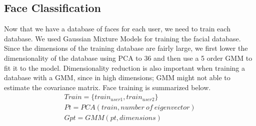 \documentclass{article}
\begin{document}
\subsection{Face Classification}
Now that we have a database of faces for each user, we need to train each database. We used Gaussian Mixture Models for training the facial database. Since the dimensions of the training database are fairly large, we first lower the dimensionality of the database using PCA to 36 and then use a 5 order GMM to fit it to the model. Dimensionality reduction is also important when training a database with a GMM, since in high dimensions; GMM might not able to estimate the covariance matrix. Face training is summarized below. 
\begin{subequations}
\begin{gather}
Train = \{train_{user1}, train_{user2}\} \\ 
Pt = PCA(train,number\ of\ eigenvector) \\ 
Gpt = GMM(pt,dimensions)
\end{gather}
\end{subequations}
\end{document}
